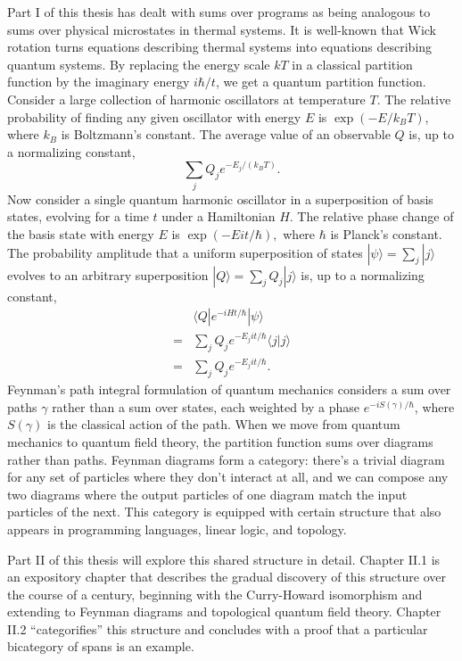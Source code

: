 \documentclass[12pt,twoside,openright]{report}
\begin{document}
Part I of this thesis has dealt with sums over programs as being analogous to sums over physical microstates in thermal systems.  It is well-known that Wick rotation turns equations describing thermal systems into equations describing quantum systems.  By replacing the energy scale $kT$ in a classical partition function by the imaginary energy $i\hbar/t$, we get a quantum partition function.  Consider a large collection of harmonic oscillators at temperature $T$.  The relative probability of finding any given oscillator with energy $E$ is $\exp(-E/k_B T)$, where $k_B$ is Boltzmann's constant. The average value of an observable $Q$ is, up to a normalizing constant,
\[ \sum_j Q_j e^{-E_j / (k_B T)}.\]
Now consider a single quantum harmonic oscillator in a superposition of basis states, evolving for a time $t$ under a Hamiltonian $H$. The relative phase change of the basis state with energy $E$ is $\exp(-E it/ \hbar),$ where $\hbar$ is Planck's constant. The probability amplitude that a uniform superposition of states $|\psi\rangle = \sum_j |j\rangle$ evolves to an arbitrary superposition $|Q\rangle = \sum_j Q_j |j\rangle$ is, up to a normalizing constant,
\begin{align*}
   & \langle Q|e^{-iHt/\hbar}|\psi\rangle \\
  = & \sum_j Q_j e^{-E_j it/ \hbar}\langle j|j\rangle \\
  = & \sum_j Q_j e^{-E_j it/ \hbar}.
\end{align*}
Feynman's path integral formulation of quantum mechanics considers a sum over paths $\gamma$ rather than a sum over states, each weighted by a phase $e^{-iS(\gamma)/\hbar}$, where $S(\gamma)$ is the classical action of the path.  When we move from quantum mechanics to quantum field theory, the partition function sums over diagrams rather than paths.  Feynman diagrams form a category: there's a trivial diagram for any set of particles where they don't interact at all, and we can compose any two diagrams where the output particles of one diagram match the input particles of the next.  This category is equipped with certain structure that also appears in programming languages, linear logic, and topology.

Part II of this thesis will explore this shared structure in detail.  Chapter II.1 is an expository chapter that describes the gradual discovery of this structure over the course of a century, beginning with the Curry-Howard isomorphism and extending to Feynman diagrams and topological quantum field theory.  Chapter II.2 ``categorifies'' this structure and concludes with a proof that a particular bicategory of spans is an example.
\end{document}
